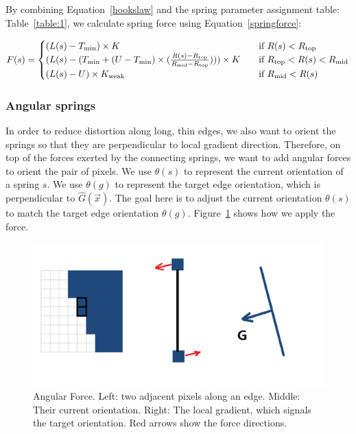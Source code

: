 By combining Equation~\eqref {hookslaw} and the spring parameter assignment table: Table~\ref{table:1}, we calculate spring force using Equation~\eqref{springforce}:

\begin{equation}\label{springforce}
F(s) = 
\begin{cases} 
(L(s) - T_{\rm min}) \times K & \quad \text{if } R(s)<R_{\rm top} \\ 
(L(s)- (T_{\rm min} + (U-T_{\rm min})\times(\frac{R(s)-R_{\rm top}}{R_{\rm mid}-R_{\rm top}})))\times{K} & \quad \text{if } R_{\rm top}<R(s)<R_{\rm mid}\\ 
(L(s) - U) \times K_{\rm weak} & \quad \text{if } R_{\rm mid}<R(s)\\ 
\end{cases} 
\end{equation}

\subsubsection{Angular springs}\label{subsec:angular}

In order to reduce distortion along long, thin edges, we also want to orient the springs so that they are perpendicular to local gradient direction. Therefore, on top of the forces exerted by the connecting springs, we want to add angular forces to orient the pair of pixels. We use $\theta(s)$ to represent the current orientation of a spring $s$. We use $\theta(g)$ to represent the target edge orientation, which is perpendicular to $\hat{G}(\vec{x})$. The goal here is to adjust the current orientation $\theta(s)$ to match the target edge orientation $\theta(g)$. Figure~\ref{fig:angForce} shows how we apply the force.

\begin{figure}[htbp]\centering
\includegraphics{imagesPM/f12.png}
\caption{Angular Force. Left: two adjacent pixels along an edge. Middle: Their current orientation. Right: The local gradient, which signals the target orientation. Red arrows show the force directions.}
\label{fig:angForce}
\end{figure}


